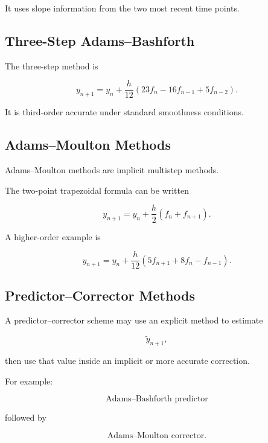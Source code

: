 It uses slope information from the two most recent time points.

\subsection{Three-Step Adams--Bashforth}
\label{subsec:ab3}

The three-step method is

\[
\boxed{
y_{n+1}
=
y_n
+
\frac{h}{12}
\left(
23f_n
-
16f_{n-1}
+
5f_{n-2}
\right).
}
\]

It is third-order accurate under standard smoothness conditions.

\subsection{Adams--Moulton Methods}
\label{subsec:adams-moulton}

Adams--Moulton methods are implicit multistep methods.

The two-point trapezoidal formula can be written

\[
\boxed{
y_{n+1}
=
y_n
+
\frac{h}{2}
(
f_n+f_{n+1}
).
}
\]

A higher-order example is

\[
\boxed{
y_{n+1}
=
y_n
+
\frac{h}{12}
\left(
5f_{n+1}
+
8f_n
-
f_{n-1}
\right).
}
\]

\subsection{Predictor--Corrector Methods}
\label{subsec:predictor-corrector}

A predictor--corrector scheme may use an explicit method to estimate

\[
\widetilde{y}_{n+1},
\]

then use that value inside an implicit or more accurate correction.

For example:

\[
\boxed{
\text{Adams--Bashforth predictor}
}
\]

followed by

\[
\boxed{
\text{Adams--Moulton corrector}.
}
\]

